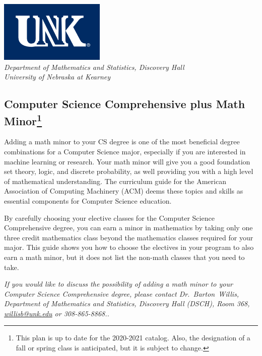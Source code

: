 \documentclass[10pt]{article}
\makeatletter
\newcommand{\contactbw}{\mbox{Dr.\ Barton Willis}, Department of Mathematics and Statistics,  Discovery Hall (DSCH), Room 368,
\href{mailto:willisb@unk.edu}{willisb@unk.edu} or 308-865-8868.}
\newcommand{\forinfo}[2]{\textcolor{unkblue}{\emph{If you would like to discuss
the possibility of adding a math {#1} to your {#2}, please contact \contactbw.}}}
\makeatother
\begin{document}
\begin{flushleft}
\includegraphics[scale=0.25]{unk-logo}\\
 \emph{\textcolor{unkblue}{Department of Mathematics and Statistics, Discovery Hall}} \\
  \emph{\textcolor{unkblue}{University of Nebraska at Kearney}}
\end{flushleft}


\subsection*{\textbf{\textcolor{unkblue}{Computer Science Comprehensive plus Math Minor\footnote[1]{This plan is up to date for the 2020-2021 catalog. Also, the designation of a fall or spring class is anticipated, but it is subject to change.
}}}}


Adding a math minor to your CS degree is one of the most beneficial degree combinations for a Computer Science major, especially if you are interested in machine learning or research.  Your math minor will give you a good foundation set theory, logic, and discrete probability, as well providing you with a high level of mathematical understanding.
The curriculum guide for the American Association of Computing Machinery (ACM) deems  these topics and skills  as essential components for  Computer Science education.

 By carefully choosing your elective classes for the Computer Science Comprehensive degree, you can earn a minor in mathematics by taking only one three credit mathematics class beyond the mathematics classes required for your major.  This guide shows you how to choose the electives in your program to also earn a math minor, but it does not list the non-math classes that you need to take.

\forinfo{minor}{Computer Science Comprehensive degree}

\end{document}
